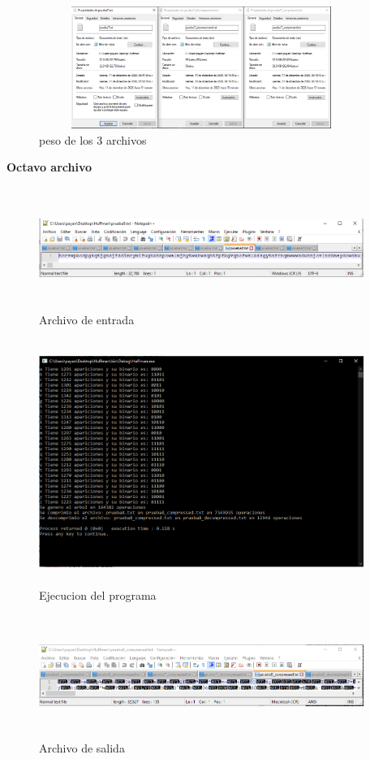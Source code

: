 \documentclass[spanish]{article}
\begin{document}
	\begin{figure}[H]
		\centering
		\includegraphics[width=400px,height=150px]{captura45}
		\caption{peso de los 3 archivos}
	\end{figure}
	\textbf{Octavo archivo}
	\begin{figure}[H]
		\centering
		\includegraphics[width=400px,height=150px]{captura46}
		\caption{Archivo de entrada}
	\end{figure}
	\begin{figure}[H]
		\centering
		\includegraphics[width=400px,height=300px]{captura47}
		\caption{Ejecucion del programa}
	\end{figure}
	\begin{figure}[H]
		\centering
		\includegraphics[width=400px,height=150px]{captura48}
		\caption{Archivo de salida}
	\end{figure}
\end{document}
